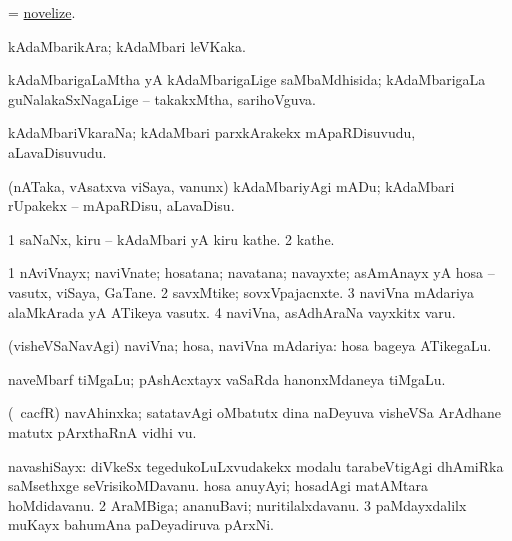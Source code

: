 \bentry
{}
\gl{\sakirx}
\bmng
= \hyperlink{novelize}{novelize}. 
\emng
\eentry

\bentry
{}
\gl{\nA}
\bmng
kAdaMbarikAra; kAdaMbari leVKaka. 
\emng
\eentry

\bentry
{}
\gl{\gu}
\bmng
kAdaMbarigaLaMtha yA kAdaMbarigaLige saMbaMdhisida; kAdaMbarigaLa guNalakaSxNagaLige -- takakxMtha, sarihoVguva. 
\emng
\eentry

\bentry
{}
\gl{\nA}
\bmng
kAdaMbariVkaraNa; kAdaMbari parxkArakekx mApaRDisuvudu, aLavaDisuvudu. 
\emng
\eentry

\bentry
{}
\gl{\sakirx}
\bmng
(nATaka, vAsatxva viSaya, \mo vanunx) kAdaMbariyAgi mADu; kAdaMbari rUpakekx -- mApaRDisu, aLavaDisu. 
\emng
\eentry

\bentry
{}
\gl{\nA}
\bmng
\bnum
\num{1} saNaNx, kiru -- kAdaMbari yA kiru kathe. 
\num{2} kathe. 
\enum
\emng
\eentry

\bentry
{}
\gl{\nA}
\bmng
\bnum
\num{1} nAviVnayx; naviVnate; hosatana; navatana; navayxte; asAmAnayx yA hosa -- vasutx, viSaya, GaTane. 
\num{2} savxMtike; sovxVpajacnxte. 
\num{3} naviVna mAdariya alaMkArada yA ATikeya vasutx. 
\num{4} naviVna, asAdhAraNa vayxkitx \mo varu. 
\enum
\emng
\eentry

\bentry
{}
\gl{\gu}
\bmng
(visheVSaNavAgi) naviVna; hosa, naviVna mAdariya:  hosa bageya ATikegaLu. 
\emng
\eentry

\bentry
{}
\gl{\nA}
\bmng
naveMbarf tiMgaLu; pAshAcxtayx vaSaRda hanonxMdaneya tiMgaLu. 
\emng
\eentry

\bentry
{}
\gl{\nA}
\bmng
(\roVkAyx\ cacfR) navAhinxka; satatavAgi oMbatutx dina naDeyuva visheVSa ArAdhane matutx pArxthaRnA vidhi \mo vu. 
\emng
\eentry

\bentry
{}
\gl{\nA}
\bmng
\bnum
{} navashiSayx: 
\banum
{} diVkeSx tegedukoLuLxvudakekx modalu tarabeVtigAgi dhAmiRka saMsethxge seVrisikoMDavanu. 
 hosa anuyAyi; hosadAgi matAMtara hoMdidavanu. 
\eanum
\numie
\num{2} AraMBiga; ananuBavi; nuritilalxdavanu. 
\num{3} paMdayxdalilx muKayx bahumAna paDeyadiruva pArxNi. 
\enum
\emng
\eentry

